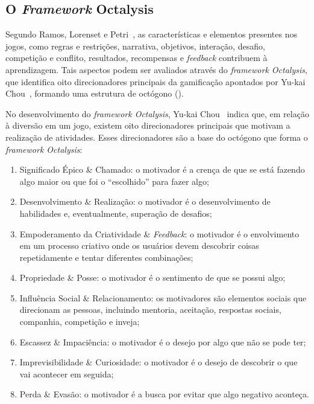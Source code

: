 \subsection{O \textit{Framework} Octalysis} \label{ssec:octalysis}

Segundo Ramos, Lorenset e Petri~\cite{ramos_jogos_2016}, as características e elementos presentes nos jogos, como  regras e restrições, narrativa, objetivos, interação, desafio, competição e conflito, resultados, recompensas e \textit{feedback} contribuem à aprendizagem. Tais aspectos podem ser avaliados através do \textit{framework Octalysis}, que identifica oito direcionadores principais da gamificação apontados por Yu-kai Chou~\cite{chou_octalysis_2015}, formando uma estrutura de octógono ().


No desenvolvimento do \textit{framework Octalysis}, Yu-kai Chou~\cite{chou_octalysis_2015} indica que, em relação à diversão em um jogo, existem oito direcionadores principais que motivam a realização de atividades. Esses direcionadores são a base do octógono que forma o  \textit{framework Octalysis}:

\begin{enumerate}
\item Significado Épico \& Chamado: o motivador é a crença de que se está fazendo algo maior ou que foi o “escolhido” para fazer algo;
\item Desenvolvimento \& Realização: o motivador é o desenvolvimento de habilidades e, eventualmente, superação de desafios;
\item Empoderamento da Criatividade \& \textit{Feedback}: o motivador é o envolvimento em um processo criativo onde os usuários devem descobrir coisas repetidamente e tentar diferentes combinações;
\item Propriedade \& Posse: o motivador é o sentimento de que se possui algo;
\item Influência Social \& Relacionamento: os motivadores são elementos sociais que direcionam as pessoas, incluindo mentoria, aceitação, respostas sociais, companhia, competição e inveja;
\item Escassez \& Impaciência: o motivador é o desejo por algo que não se pode ter;
\item Imprevisibilidade \& Curiosidade: o motivador é o desejo de descobrir o que vai acontecer em seguida;
\item Perda \& Evasão: o motivador é a busca por evitar que algo negativo aconteça.
\end{enumerate}


